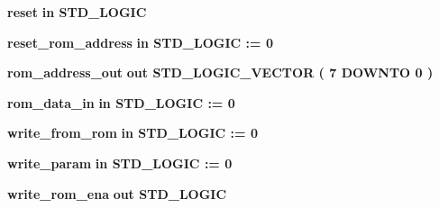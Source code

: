 \begin{DoxyCompactItemize}
\item 
{\bf reset}  {\bfseries {\bfseries \textcolor{keywordflow}{in}\textcolor{vhdlchar}{ }}} {\bfseries \textcolor{comment}{S\+T\+D\+\_\+\+L\+O\+G\+IC}\textcolor{vhdlchar}{ }} 
\item 
{\bf reset\+\_\+rom\+\_\+address}  {\bfseries {\bfseries \textcolor{keywordflow}{in}\textcolor{vhdlchar}{ }}} {\bfseries \textcolor{comment}{S\+T\+D\+\_\+\+L\+O\+G\+IC}\textcolor{vhdlchar}{ }\textcolor{vhdlchar}{ }\textcolor{vhdlchar}{\+:}\textcolor{vhdlchar}{=}\textcolor{vhdlchar}{ }\textcolor{vhdlchar}{ }\textcolor{vhdlchar}{\textquotesingle{}}\textcolor{vhdlchar}{ } \textcolor{vhdldigit}{0} \textcolor{vhdlchar}{ }\textcolor{vhdlchar}{\textquotesingle{}}\textcolor{vhdlchar}{ }} 
\item 
{\bf rom\+\_\+address\+\_\+out}  {\bfseries {\bfseries \textcolor{keywordflow}{out}\textcolor{vhdlchar}{ }}} {\bfseries \textcolor{comment}{S\+T\+D\+\_\+\+L\+O\+G\+I\+C\+\_\+\+V\+E\+C\+T\+OR}\textcolor{vhdlchar}{ }\textcolor{vhdlchar}{(}\textcolor{vhdlchar}{ }\textcolor{vhdlchar}{ } \textcolor{vhdldigit}{7} \textcolor{vhdlchar}{ }\textcolor{keywordflow}{D\+O\+W\+N\+TO}\textcolor{vhdlchar}{ }\textcolor{vhdlchar}{ } \textcolor{vhdldigit}{0} \textcolor{vhdlchar}{ }\textcolor{vhdlchar}{)}\textcolor{vhdlchar}{ }} 
\item 
{\bf rom\+\_\+data\+\_\+in}  {\bfseries {\bfseries \textcolor{keywordflow}{in}\textcolor{vhdlchar}{ }}} {\bfseries \textcolor{comment}{S\+T\+D\+\_\+\+L\+O\+G\+IC}\textcolor{vhdlchar}{ }\textcolor{vhdlchar}{ }\textcolor{vhdlchar}{\+:}\textcolor{vhdlchar}{=}\textcolor{vhdlchar}{ }\textcolor{vhdlchar}{ }\textcolor{vhdlchar}{\textquotesingle{}}\textcolor{vhdlchar}{ } \textcolor{vhdldigit}{0} \textcolor{vhdlchar}{ }\textcolor{vhdlchar}{\textquotesingle{}}\textcolor{vhdlchar}{ }} 
\item 
{\bf write\+\_\+from\+\_\+rom}  {\bfseries {\bfseries \textcolor{keywordflow}{in}\textcolor{vhdlchar}{ }}} {\bfseries \textcolor{comment}{S\+T\+D\+\_\+\+L\+O\+G\+IC}\textcolor{vhdlchar}{ }\textcolor{vhdlchar}{ }\textcolor{vhdlchar}{\+:}\textcolor{vhdlchar}{=}\textcolor{vhdlchar}{ }\textcolor{vhdlchar}{ }\textcolor{vhdlchar}{\textquotesingle{}}\textcolor{vhdlchar}{ } \textcolor{vhdldigit}{0} \textcolor{vhdlchar}{ }\textcolor{vhdlchar}{\textquotesingle{}}\textcolor{vhdlchar}{ }} 
\item 
{\bf write\+\_\+param}  {\bfseries {\bfseries \textcolor{keywordflow}{in}\textcolor{vhdlchar}{ }}} {\bfseries \textcolor{comment}{S\+T\+D\+\_\+\+L\+O\+G\+IC}\textcolor{vhdlchar}{ }\textcolor{vhdlchar}{ }\textcolor{vhdlchar}{\+:}\textcolor{vhdlchar}{=}\textcolor{vhdlchar}{ }\textcolor{vhdlchar}{ }\textcolor{vhdlchar}{\textquotesingle{}}\textcolor{vhdlchar}{ } \textcolor{vhdldigit}{0} \textcolor{vhdlchar}{ }\textcolor{vhdlchar}{\textquotesingle{}}\textcolor{vhdlchar}{ }} 
\item 
{\bf write\+\_\+rom\+\_\+ena}  {\bfseries {\bfseries \textcolor{keywordflow}{out}\textcolor{vhdlchar}{ }}} {\bfseries \textcolor{comment}{S\+T\+D\+\_\+\+L\+O\+G\+IC}\textcolor{vhdlchar}{ }} 
\end{DoxyCompactItemize}


